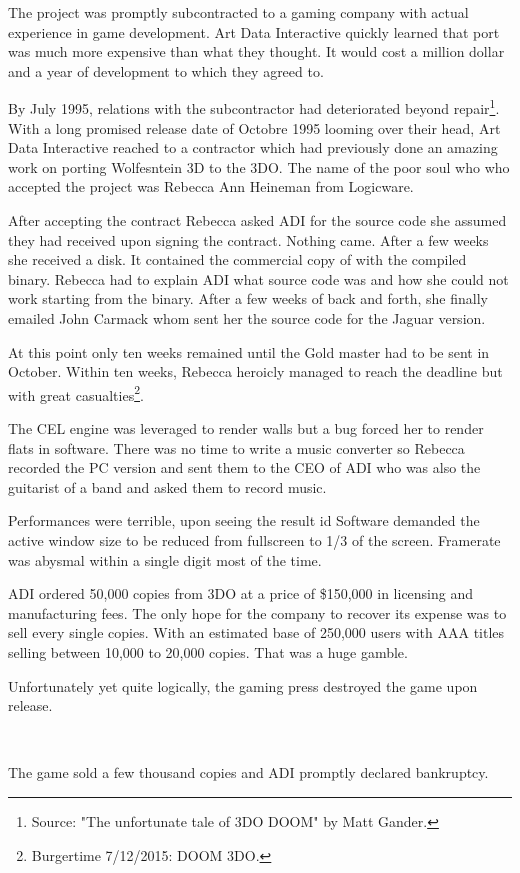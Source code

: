 The project was promptly subcontracted to a gaming company with actual experience in game development. Art Data Interactive quickly learned that port was much more expensive than what they thought. It would cost a million dollar and a year of development to which they agreed to.\\
\par
By July 1995, relations with the subcontractor had deteriorated beyond repair\footnote{Source: "The unfortunate tale of 3DO DOOM" by Matt Gander.}. With a long promised release date of Octobre 1995 looming over their head, Art Data Interactive reached to a contractor which had previously done an amazing work on porting Wolfesntein 3D to the 3DO. The name of the poor soul who who accepted the project was Rebecca Ann Heineman from Logicware.\\
\par
After accepting the contract Rebecca asked ADI for the source code she assumed they had received upon signing the contract. Nothing came. After a few weeks she received a disk. It contained the commercial copy of \doom with the compiled binary. Rebecca had to explain ADI what source code was and how she could not work starting from the binary. After a few weeks of back and forth, she finally emailed John Carmack whom sent her the source code for the Jaguar version.\\
\par
 At this point only ten weeks remained until the Gold master had to be sent in October. Within ten weeks, Rebecca heroicly managed to reach the deadline but with great casualties\footnote{Burgertime 7/12/2015: DOOM 3DO.}.\\
\par
{}
\par
The CEL engine was leveraged to render walls but a bug forced her to render flats in software. There was no time to write a music converter so Rebecca recorded the PC version and sent them to the CEO of ADI who was also the guitarist of a band and asked them to record music.\\ 
\par
 Performances were terrible, upon seeing the result id Software demanded the active window size to be reduced from fullscreen to 1/3 of the screen. Framerate was abysmal within a single digit most of the time.\\
\par
ADI ordered 50,000 copies from 3DO at a price of \$150,000 in licensing and manufacturing fees. The only hope for the company to recover its expense was to sell every single copies. With an estimated base of 250,000 users with AAA titles selling between 10,000 to 20,000 copies. That was a huge gamble.\\
\par
Unfortunately yet quite logically, the gaming press destroyed the game upon release.\\
\par
{}\\
\par
 The game sold a few thousand copies and ADI promptly declared bankruptcy.

